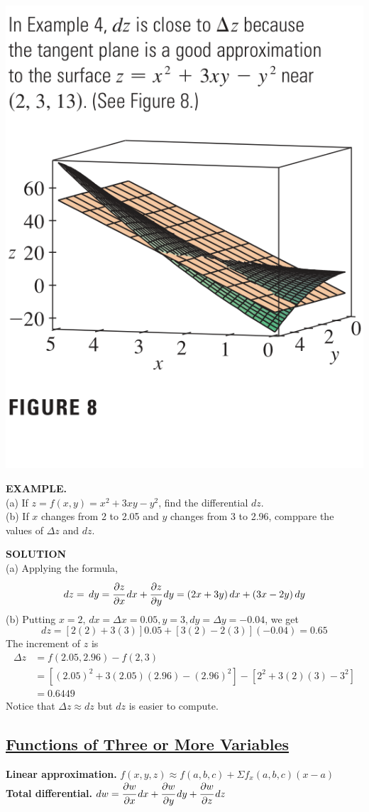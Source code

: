 \documentclass{article}
\begin{document}
\begin{minipage}[]{0.3\linewidth}
  \includegraphics[width = 4.3 cm]{./images/fig8.png}
\end{minipage}
\begin{minipage}[]{0.64\linewidth}
  {\selectfont \textbf{\textcolor{blue5}{{\small {}} EXAMPLE.}}} \\
  (a) If $z = f(x,y) = x^2 + 3xy - y^2 $, find the differential $dz $.\\
  (b) If $x $ changes from 2 to 2.05 and $y $ changes from 3 to 2.96, comppare the values of $\Delta z $ and $dz$.

  \noindent
  {\selectfont \textbf{\textcolor{blue5}{SOLUTION}}} \\
  (a) Applying the formula, \[dz = \,dy = \cfrac{\partial z }{\partial x }\, dx + \cfrac{\partial z }{ \partial y }\, dy = (2x + 3y) \,dx + (3x - 2y)\,dy\]
  (b) Putting $x = 2, \,dx = \Delta x = 0.05, y = 3, dy = \Delta y = -0.04$, we get
  \[dz = [2(2) + 3 (3)]0.05 + [3(2) - 2(3)](-0.04) = 0.65\]
  The increment of $z $ is 
  \begin{align*}
    \Delta z & = f(2.05, 2.96) - f(2,3) \\
             & = [(2.05)^2 + 3(2.05)(2.96) - (2.96)^2] - [2^2 + 3(2)(3) - 3^2] \\
             &= 0.6449
  \end{align*}
{\small {}}
Notice that $\Delta z \approx dz$ but $dz $ is easier to compute.

\end{minipage}

\subsection*{{\selectfont \underline{Functions of Three or More Variables}}}
\textbf{Linear approximation.} $f(x,y,z) \approx f(a,b,c) + \Sigma f_x (a,b,c)(x-a)$ \\
\textbf{Total differential.} $dw = \cfrac{\partial w }{\partial x }\, dx + \cfrac{\partial w }{ \partial y }\, dy + \cfrac{\partial w }{\partial z } \,dz$
\end{document}
